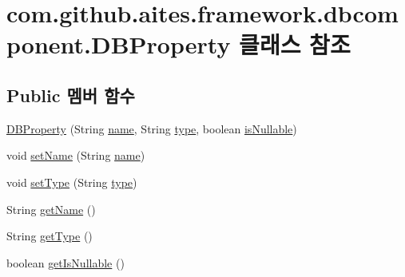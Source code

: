 \hypertarget{classcom_1_1github_1_1aites_1_1framework_1_1dbcomponent_1_1_d_b_property}{}\section{com.\+github.\+aites.\+framework.\+dbcomponent.\+D\+B\+Property 클래스 참조}
\label{classcom_1_1github_1_1aites_1_1framework_1_1dbcomponent_1_1_d_b_property}
\subsection*{Public 멤버 함수}
\begin{DoxyCompactItemize}
\item 
\mbox{\hyperlink{classcom_1_1github_1_1aites_1_1framework_1_1dbcomponent_1_1_d_b_property_a2bcc24b031bca19286c400a2bdc94538}{D\+B\+Property}} (String \mbox{\hyperlink{classcom_1_1github_1_1aites_1_1framework_1_1dbcomponent_1_1_d_b_property_ada4967ef698663a6b4d30402e6945702}{name}}, String \mbox{\hyperlink{classcom_1_1github_1_1aites_1_1framework_1_1dbcomponent_1_1_d_b_property_aee1abc4b687abc96bedf9b19d1f52a95}{type}}, boolean \mbox{\hyperlink{classcom_1_1github_1_1aites_1_1framework_1_1dbcomponent_1_1_d_b_property_a09f366cba7a3b9bc3dfeb0cc2941b964}{is\+Nullable}})
\item 
void \mbox{\hyperlink{classcom_1_1github_1_1aites_1_1framework_1_1dbcomponent_1_1_d_b_property_ae2b3c66918c5890437b3d723094ce60b}{set\+Name}} (String \mbox{\hyperlink{classcom_1_1github_1_1aites_1_1framework_1_1dbcomponent_1_1_d_b_property_ada4967ef698663a6b4d30402e6945702}{name}})
\item 
void \mbox{\hyperlink{classcom_1_1github_1_1aites_1_1framework_1_1dbcomponent_1_1_d_b_property_a8ac9e10400c059b319cef19c8f37d95d}{set\+Type}} (String \mbox{\hyperlink{classcom_1_1github_1_1aites_1_1framework_1_1dbcomponent_1_1_d_b_property_aee1abc4b687abc96bedf9b19d1f52a95}{type}})
\item 
String \mbox{\hyperlink{classcom_1_1github_1_1aites_1_1framework_1_1dbcomponent_1_1_d_b_property_a3cb2d9e039a3ceff0ee9efd4079f4abf}{get\+Name}} ()
\item 
String \mbox{\hyperlink{classcom_1_1github_1_1aites_1_1framework_1_1dbcomponent_1_1_d_b_property_aaac9bd92c4e8e5450741c12d02bb96c8}{get\+Type}} ()
\item 
boolean \mbox{\hyperlink{classcom_1_1github_1_1aites_1_1framework_1_1dbcomponent_1_1_d_b_property_ab9502f62c73fe99c0328b77ed89b1b81}{get\+Is\+Nullable}} ()
\end{DoxyCompactItemize}
